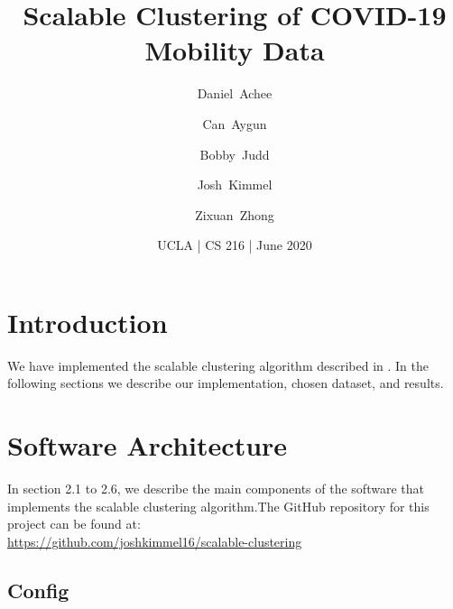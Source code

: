 \documentclass{article}
\title{Scalable Clustering of COVID-19 Mobility Data }
\author{Daniel~Achee\and Can~Aygun \and Bobby~Judd \and Josh~Kimmel \and Zixuan~Zhong}
\date{UCLA | CS 216 | June 2020}
\begin{document}
\maketitle

\section{Introduction}
We have implemented the scalable clustering algorithm described in \cite{sc-paper}.  In the following sections we describe our implementation, chosen dataset, and results.

\section{Software Architecture}
In section 2.1 to 2.6, we describe the main components of the software that implements the scalable clustering algorithm.The GitHub repository for this project can be found at: \\ \url{https://github.com/joshkimmel16/scalable-clustering}

\subsection{Config}
\end{document}
